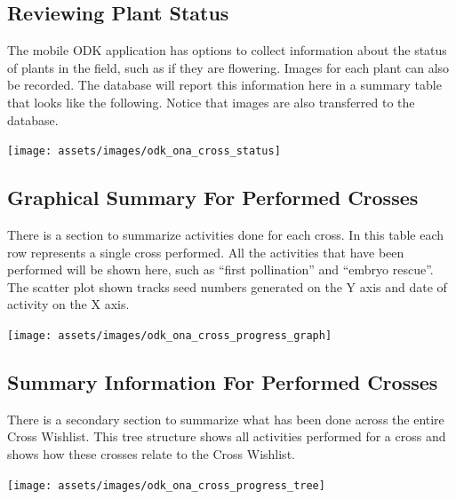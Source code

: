 \documentclass[
  12pt,
]{book}
\begin{document}
\hypertarget{reviewing-plant-status}{%
\subsection{Reviewing Plant Status}\label{reviewing-plant-status}}

The mobile ODK application has options to collect information about the status of plants in the field, such as if they are flowering. Images for each plant can also be recorded. The database will report this information here in a summary table that looks like the following. Notice that images are also transferred to the database.

\begin{center}\texttt{[image: assets/images/odk\_ona\_cross\_status]} \end{center}

\hypertarget{graphical-summary-for-performed-crosses}{%
\subsection{Graphical Summary For Performed Crosses}\label{graphical-summary-for-performed-crosses}}

There is a section to summarize activities done for each cross. In this table each row represents a single cross performed. All the activities that have been performed will be shown here, such as ``first pollination'' and ``embryo rescue''. The scatter plot shown tracks seed numbers generated on the Y axis and date of activity on the X axis.

\begin{center}\texttt{[image: assets/images/odk\_ona\_cross\_progress\_graph]} \end{center}

\hypertarget{summary-information-for-performed-crosses}{%
\subsection{Summary Information For Performed Crosses}\label{summary-information-for-performed-crosses}}

There is a secondary section to summarize what has been done across the entire Cross Wishlist. This tree structure shows all activities performed for a cross and shows how these crosses relate to the Cross Wishlist.

\begin{center}\texttt{[image: assets/images/odk\_ona\_cross\_progress\_tree]} \end{center}
\end{document}
